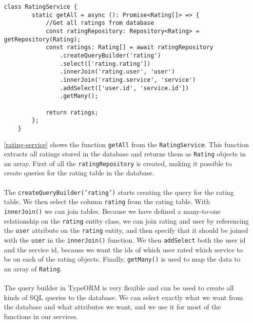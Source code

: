 \begin{lstlisting}[caption={Shows the function used to get get all ratings from the rating service}, captionpos=b, label={rating-service}]
    class RatingService {
        static getAll = async (): Promise<Rating[]> => {
            //Get all ratings from database
            const ratingRepository: Repository<Rating> = getRepository(Rating);
            const ratings: Rating[] = await ratingRepository
                .createQueryBuilder('rating')
                .select(['rating.rating'])
                .innerJoin('rating.user', 'user')
                .innerJoin('rating.service', 'service')
                .addSelect(['user.id', 'service.id'])
                .getMany();
    
            return ratings;
        };
    }
\end{lstlisting}
\autoref{rating-service} shows the function \texttt{getAll} from the \texttt{RatingService}.
This function extracts all ratings stored in the database and returns them as \texttt{Rating} objects in an array.
First of all the \texttt{ratingRepository} is created, making it possible to create queries for the rating table in the database. 
\\\\
The \texttt{createQueryBuilder('rating')} starts creating the query for the rating table. 
We then select the column \texttt{rating} from the rating table. 
With \texttt{innerJoin()} we can join tables.
Because we have defined a many-to-one relationship on the \texttt{rating} entity class, we can join rating and user by referencing the \texttt{user} attribute on the \texttt{rating} entity, and then specify that it should be joined with the \texttt{user} in the \texttt{innerJoin()} function. 
We then \texttt{addSelect} both the user id and the service id, because we want the ids of which user rated which service to be on each of the rating objects. 
Finally, \texttt{getMany()} is used to map the data to an array of \texttt{Rating}.
\\\\
The query builder in TypeORM is very flexible and can be used to create all kinds of SQL queries to the database. 
We can select exactly what we want from the database and what attributes we want, and we use it for most of the functions in our services.

